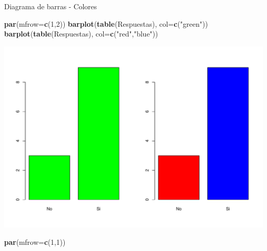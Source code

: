 \documentclass[
  ignorenonframetext,
]{beamer}
\newenvironment{Shaded}{\begin{snugshade}}{\end{snugshade}}
\newcommand{\AttributeTok}[1]{\textcolor[rgb]{0.13,0.29,0.53}{#1}}
\newcommand{\DecValTok}[1]{\textcolor[rgb]{0.00,0.00,0.81}{#1}}
\newcommand{\FunctionTok}[1]{\textcolor[rgb]{0.13,0.29,0.53}{\textbf{#1}}}
\newcommand{\NormalTok}[1]{#1}
\newcommand{\StringTok}[1]{\textcolor[rgb]{0.31,0.60,0.02}{#1}}
\begin{document}
\begin{frame}[fragile]{Diagrama de barras - Colores}
\label{diagrama-de-barras---colores}
\begin{Shaded}
\begin{Highlighting}[]
\FunctionTok{par}\NormalTok{(}\AttributeTok{mfrow=}\FunctionTok{c}\NormalTok{(}\DecValTok{1}\NormalTok{,}\DecValTok{2}\NormalTok{))}
\FunctionTok{barplot}\NormalTok{(}\FunctionTok{table}\NormalTok{(Respuestas), }\AttributeTok{col=}\FunctionTok{c}\NormalTok{(}\StringTok{"green"}\NormalTok{))}
\FunctionTok{barplot}\NormalTok{(}\FunctionTok{table}\NormalTok{(Respuestas), }\AttributeTok{col=}\FunctionTok{c}\NormalTok{(}\StringTok{"red"}\NormalTok{,}\StringTok{"blue"}\NormalTok{))}
\end{Highlighting}
\end{Shaded}

\includegraphics{R_base_files/figure-beamer/unnamed-chunk-87-1.pdf}

\begin{Shaded}
\begin{Highlighting}[]
\FunctionTok{par}\NormalTok{(}\AttributeTok{mfrow=}\FunctionTok{c}\NormalTok{(}\DecValTok{1}\NormalTok{,}\DecValTok{1}\NormalTok{))}
\end{Highlighting}
\end{Shaded}
\end{frame}
\end{document}
